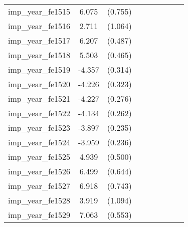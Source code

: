 {\begin{tabular}{l*{4}{cc}}
imp\_year\_fe1515&    6.075\sym{***}&  (0.755)&                  &         &                  &         &                  &         \\
imp\_year\_fe1516&    2.711\sym{*}  &  (1.064)&                  &         &                  &         &                  &         \\
imp\_year\_fe1517&    6.207\sym{***}&  (0.487)&                  &         &                  &         &                  &         \\
imp\_year\_fe1518&    5.503\sym{***}&  (0.465)&                  &         &                  &         &                  &         \\
imp\_year\_fe1519&   -4.357\sym{***}&  (0.314)&                  &         &                  &         &                  &         \\
imp\_year\_fe1520&   -4.226\sym{***}&  (0.323)&                  &         &                  &         &                  &         \\
imp\_year\_fe1521&   -4.227\sym{***}&  (0.276)&                  &         &                  &         &                  &         \\
imp\_year\_fe1522&   -4.134\sym{***}&  (0.262)&                  &         &                  &         &                  &         \\
imp\_year\_fe1523&   -3.897\sym{***}&  (0.235)&                  &         &                  &         &                  &         \\
imp\_year\_fe1524&   -3.959\sym{***}&  (0.236)&                  &         &                  &         &                  &         \\
imp\_year\_fe1525&    4.939\sym{***}&  (0.500)&                  &         &                  &         &                  &         \\
imp\_year\_fe1526&    6.499\sym{***}&  (0.644)&                  &         &                  &         &                  &         \\
imp\_year\_fe1527&    6.918\sym{***}&  (0.743)&                  &         &                  &         &                  &         \\
imp\_year\_fe1528&    3.919\sym{***}&  (1.094)&                  &         &                  &         &                  &         \\
imp\_year\_fe1529&    7.063\sym{***}&  (0.553)&                  &         &                  &         &                  &         \\

\end{tabular}}
